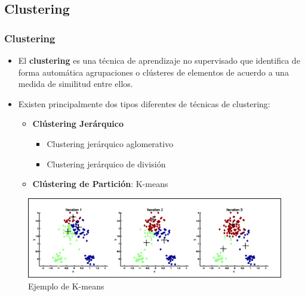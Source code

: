 \documentclass[9pt]{beamer} %
\begin{document}
	\subsection{Clustering}
		\begin{frame}
		\frametitle{Clustering}
\begin{itemize}

		\item[] El \textbf{clustering} es una técnica de aprendizaje no supervisado que identifica de forma automática agrupaciones o clústeres de elementos de acuerdo a una medida de similitud entre ellos. 
		\item[] Existen principalmente dos tipos diferentes de técnicas de clustering:
		\begin{itemize}
		\item \textbf{Clústering Jerárquico}
		\begin{itemize}
		\item Clustering jerárquico aglomerativo
		\item Clustering jerárquico de división
		\end{itemize}
		\item \textbf{Clústering de Partición}: K-means
		\end{itemize}
		
\end{itemize}
			\begin{figure}[H]
		\includegraphics[scale=0.6]{Iteraciones1a3} 
		\caption{Ejemplo de K-means}
	\end{figure}
		\end{frame}
\end{document}
